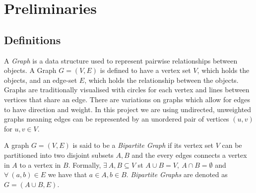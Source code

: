 \documentclass[11pt,twoside,a4paper]{report}
\begin{document}
\renewcommand\thechapter{\arabic{chapter}}
\renewcommand\thesection{\thechapter.\arabic{section}}
\setcounter{chapter}{0}
\chapter{Preliminaries}

\setcounter{page}{1} %

\section{Definitions}


A \textit{Graph} is a data structure used to represent pairwise relationships between objects. A Graph $G=(V,E)$ is defined to have a vertex set $V$, which holds the objects, and an edge-set $E$, which holds the relationship between the objects. Graphs are traditionally visualised with circles for each vertex and lines between vertices that share an edge. There are variations on graphs which allow for edges to have direction and weight. In this project we are using undirected, unweighted graphs meaning edges can be represented by an unordered pair of vertices $(u,v)$ for $u,v\in V$.

\par A graph $G=(V,E)$ is said to be a \textit{Bipartite Graph} if its vertex set $V$ can be partitioned into two disjoint subsets $A,B$ and the every edges connects a vertex in $A$ to a vertex in $B$. Formally, $\exists\ A,B\subseteq V$ st $A\cup B=V,\ A\cap B=\emptyset$ and $\forall\ (a,b)\in E$ we have that $a\in A,b\in B$. \textit{Bipartite Graphs} are denoted as $G=(A\cup B,E)$.
\end{document}
